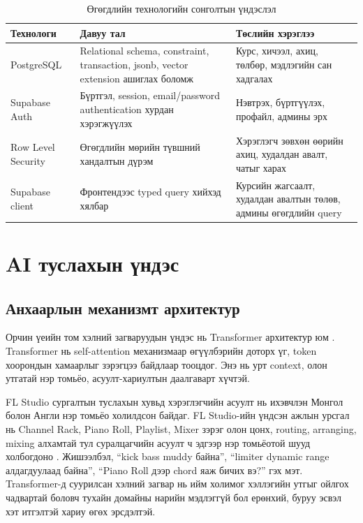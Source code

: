 \begin{table}[htbp]
  \centering
  \begin{tabular}{|p{}|p{}|p{}|}
    \hline
    \textbf{Технологи} & \textbf{Давуу тал} & \textbf{Төслийн хэрэглээ} \\ \hline
    PostgreSQL & Relational schema, constraint, transaction, jsonb, vector extension ашиглах боломж & Курс, хичээл, ахиц, төлбөр, мэдлэгийн сан хадгалах \\ \hline
    Supabase Auth & Бүртгэл, session, email/password authentication хурдан хэрэгжүүлэх & Нэвтрэх, бүртгүүлэх, профайл, админы эрх \\ \hline
    Row Level Security & Өгөгдлийн мөрийн түвшний хандалтын дүрэм & Хэрэглэгч зөвхөн өөрийн ахиц, худалдан авалт, чатыг харах \\ \hline
    Supabase client & Фронтендээс typed query хийхэд хялбар & Курсийн жагсаалт, худалдан авалтын төлөв, админы өгөгдлийн query \\ \hline
  \end{tabular}
  \caption{Өгөгдлийн технологийн сонголтын үндэслэл}
  \label{tab:data-tech-choice}
\end{table}

\section{AI туслахын үндэс}
\subsection{Анхаарлын механизмт архитектур}
Орчин үеийн том хэлний загваруудын үндэс нь Transformer архитектур юм \cite{attention_vaswani_2017}. Transformer нь self-attention механизмаар өгүүлбэрийн доторх үг, token хоорондын хамаарлыг зэрэгцээ байдлаар тооцдог. Энэ нь урт context, олон утгатай нэр томьёо, асуулт-хариултын даалгаварт хүчтэй.

FL Studio сургалтын туслахын хувьд хэрэглэгчийн асуулт нь ихэвчлэн Монгол болон Англи нэр томьёо холилдсон байдаг. FL Studio-ийн үндсэн ажлын урсгал нь Channel Rack, Piano Roll, Playlist, Mixer зэрэг олон цонх, routing, arranging, mixing алхамтай тул суралцагчийн асуулт ч эдгээр нэр томьёотой шууд холбогдоно \cite{flstudio_workflow}. Жишээлбэл, “kick bass muddy байна”, “limiter dynamic range алдагдуулаад байна”, “Piano Roll дээр chord яаж бичих вэ?” гэх мэт. Transformer-д суурилсан хэлний загвар нь ийм холимог хэллэгийн утгыг ойлгох чадвартай боловч тухайн домайны нарийн мэдлэггүй бол ерөнхий, буруу эсвэл хэт итгэлтэй хариу өгөх эрсдэлтэй.

